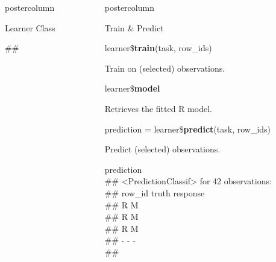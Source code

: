 \documentclass{beamer}
\newlength{\columnheight} %
\begin{document}
\begin{frame}[fragile]{}
\begin{columns}
\begin{column}{.245\textwidth}
\begin{beamercolorbox}[center]{postercolumn}
\begin{minipage}{.98\textwidth}
{\begin{myblock}{Learner Class}
\begin{codeboxexample}
{								\#\# }
						\end{codeboxexample}
					\end{myblock}
					\vfill
					}
				\end{minipage}
			\end{beamercolorbox}
		\end{column}
		\begin{column}{.245\textwidth}
			\begin{beamercolorbox}[center]{postercolumn}
				\begin{minipage}{.98\textwidth}
					\parbox[t][\columnheight]{\textwidth}{
						\begin{myblock}{Train \& Predict}
						\begin{codebox}
							learner\$\textbf{train}(task, row\_ids)
						\end{codebox}
                        Train on (selected) observations. 
						\\
						\begin{codebox}
							learner\$\textbf{model}
						\end{codebox}
						Retrieves the fitted R model.
						\\
						\vspace{1em} %
						\begin{codebox}
							prediction = learner\$\textbf{predict}(task, row\_ids)
						\end{codebox}
                        Predict (selected) observations.
                        \\
                        \begin{codeboxmultiline}[width=23cm]
							{\footnotesize prediction\\
							\#\# <PredictionClassif> for 42 observations:\\
							\#\# row\_id truth response\\
							\#\# \space\space\space\space\space 2
							\space\space\space\space R \space\space\space\space\space\space\space M\\
							\#\# \space\space\space\space\space 3
							\space\space\space\space R \space\space\space\space\space\space\space M\\
							\#\# \space\space\space\space\space 5
							\space\space\space\space R \space\space\space\space\space\space\space M\\
							\#\# - - -\\
							\#\# \space\space\space 198
}
\end{codeboxmultiline}
\end{myblock}}
\end{minipage}
\end{beamercolorbox}
\end{column}
\end{columns}
\end{frame}
\end{document}
